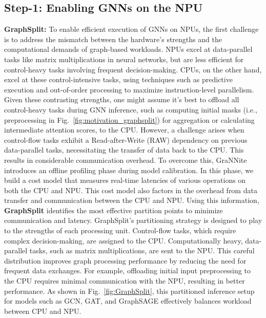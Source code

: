 \subsection{Step-1: Enabling GNNs on the NPU}
\textbf{GraphSplit:} To enable efficient execution of GNNs on NPUs, the first challenge is to address the mismatch between the hardware's strengths and the computational demands of graph-based workloads. NPUs excel at data-parallel tasks like matrix multiplications in neural networks, but are less efficient for control-heavy tasks involving frequent decision-making. CPUs, on the other hand, excel at these control-intensive tasks, using techniques such as predictive execution and out-of-order processing to maximize instruction-level parallelism.
Given these contrasting strengths, one might assume it’s best to offload all control-heavy tasks during GNN inference, such as computing initial masks (i.e., preprocessing in Fig.~\ref{fig:motivation_graphsplit}) for aggregation or calculating intermediate attention scores, to the CPU. However, a challenge arises when control-flow tasks exhibit a Read-after-Write (RAW) dependency on previous data-parallel tasks, necessitating the transfer of data back to the CPU. This results in considerable communication overhead.
To overcome this, GraNNite introduces an offline profiling phase during model calibration. In this phase, we build a cost model that measures real-time latencies of various operations on both the CPU and NPU. This cost model also factors in the overhead from data transfer and communication between the CPU and NPU. Using this information, \textbf{GraphSplit} identifies the most effective partition points to minimize communication and latency.
GraphSplit’s partitioning strategy is designed to play to the strengths of each processing unit. Control-flow tasks, which require complex decision-making, are assigned to the CPU. Computationally heavy, data-parallel tasks, such as matrix multiplications, are sent to the NPU. This careful distribution improves graph processing performance by reducing the need for frequent data exchanges. For example, offloading initial input preprocessing to the CPU requires minimal communication with the NPU, resulting in better performance.
As shown in Fig.~\ref{fig:GraphSplit}, this partitioned inference setup for models such as GCN, GAT, and GraphSAGE effectively balances workload between CPU and NPU.

